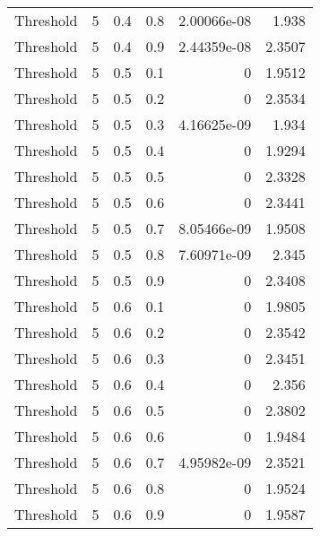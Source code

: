 \documentclass{article}
\begin{document}
\begin{longtable}[H]{lrrrrr}
 Threshold      &       5 &   0.4 &            0.8 &      2.00066e-08 &          1.938  \\
 Threshold      &       5 &   0.4 &            0.9 &      2.44359e-08 &          2.3507 \\
 Threshold      &       5 &   0.5 &            0.1 &      0           &          1.9512 \\
 Threshold      &       5 &   0.5 &            0.2 &      0           &          2.3534 \\
 Threshold      &       5 &   0.5 &            0.3 &      4.16625e-09 &          1.934  \\
 Threshold      &       5 &   0.5 &            0.4 &      0           &          1.9294 \\
 Threshold      &       5 &   0.5 &            0.5 &      0           &          2.3328 \\
 Threshold      &       5 &   0.5 &            0.6 &      0           &          2.3441 \\
 Threshold      &       5 &   0.5 &            0.7 &      8.05466e-09 &          1.9508 \\
 Threshold      &       5 &   0.5 &            0.8 &      7.60971e-09 &          2.345  \\
 Threshold      &       5 &   0.5 &            0.9 &      0           &          2.3408 \\
 Threshold      &       5 &   0.6 &            0.1 &      0           &          1.9805 \\
 Threshold      &       5 &   0.6 &            0.2 &      0           &          2.3542 \\
 Threshold      &       5 &   0.6 &            0.3 &      0           &          2.3451 \\
 Threshold      &       5 &   0.6 &            0.4 &      0           &          2.356  \\
 Threshold      &       5 &   0.6 &            0.5 &      0           &          2.3802 \\
 Threshold      &       5 &   0.6 &            0.6 &      0           &          1.9484 \\
 Threshold      &       5 &   0.6 &            0.7 &      4.95982e-09 &          2.3521 \\
 Threshold      &       5 &   0.6 &            0.8 &      0           &          1.9524 \\
 Threshold      &       5 &   0.6 &            0.9 &      0           &          1.9587 \\

\end{longtable}
\end{document}
